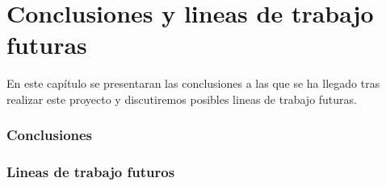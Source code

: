 %
%
%

\chapter{Conclusiones y lineas de trabajo futuras} \label{chap:conclusiones} 

En este capítulo se presentaran las conclusiones a las que se ha llegado tras realizar este proyecto y discutiremos posibles lineas de trabajo futuras.

\subsection{Conclusiones}


\subsection{Lineas de trabajo futuros}


